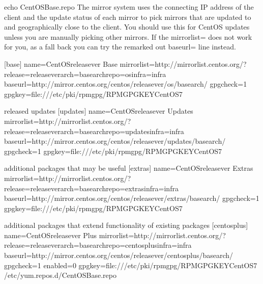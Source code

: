 \documentclass[letterpaper,10pt,english]{sphinxmanual}
\begin{document}
%
\begin{sphinxVerbatim}[commandchars=\\\{\}]
echo\PYGZdq{}
\PYGZsh{} CentOS\PYGZhy{}Base.repo
\PYGZsh{}
\PYGZsh{} The mirror system uses the connecting IP address of the client and the
\PYGZsh{} update status of each mirror to pick mirrors that are updated to and
\PYGZsh{} geographically close to the client.  You should use this for CentOS updates
\PYGZsh{} unless you are manually picking other mirrors.
\PYGZsh{}
\PYGZsh{} If the mirrorlist= does not work for you, as a fall back you can try the
\PYGZsh{} remarked out baseurl= line instead.
\PYGZsh{}
\PYGZsh{}

[base]
name=CentOS\PYGZhy{}\PYGZdl{}releasever \PYGZhy{} Base
mirrorlist=http://mirrorlist.centos.org/?release=\PYGZdl{}releasever\PYGZam{}arch=\PYGZdl{}basearch\PYGZam{}repo=os\PYGZam{}infra=\PYGZdl{}infra
\PYGZsh{}baseurl=http://mirror.centos.org/centos/\PYGZdl{}releasever/os/\PYGZdl{}basearch/
gpgcheck=1
gpgkey=file:///etc/pki/rpm\PYGZhy{}gpg/RPM\PYGZhy{}GPG\PYGZhy{}KEY\PYGZhy{}CentOS\PYGZhy{}7

\PYGZsh{}released updates
[updates]
name=CentOS\PYGZhy{}\PYGZdl{}releasever \PYGZhy{} Updates
mirrorlist=http://mirrorlist.centos.org/?release=\PYGZdl{}releasever\PYGZam{}arch=\PYGZdl{}basearch\PYGZam{}repo=updates\PYGZam{}infra=\PYGZdl{}infra
\PYGZsh{}baseurl=http://mirror.centos.org/centos/\PYGZdl{}releasever/updates/\PYGZdl{}basearch/
gpgcheck=1
gpgkey=file:///etc/pki/rpm\PYGZhy{}gpg/RPM\PYGZhy{}GPG\PYGZhy{}KEY\PYGZhy{}CentOS\PYGZhy{}7

\PYGZsh{}additional packages that may be useful
[extras]
name=CentOS\PYGZhy{}\PYGZdl{}releasever \PYGZhy{} Extras
mirrorlist=http://mirrorlist.centos.org/?release=\PYGZdl{}releasever\PYGZam{}arch=\PYGZdl{}basearch\PYGZam{}repo=extras\PYGZam{}infra=\PYGZdl{}infra
\PYGZsh{}baseurl=http://mirror.centos.org/centos/\PYGZdl{}releasever/extras/\PYGZdl{}basearch/
gpgcheck=1
gpgkey=file:///etc/pki/rpm\PYGZhy{}gpg/RPM\PYGZhy{}GPG\PYGZhy{}KEY\PYGZhy{}CentOS\PYGZhy{}7

\PYGZsh{}additional packages that extend functionality of existing packages
[centosplus]
name=CentOS\PYGZhy{}\PYGZdl{}releasever \PYGZhy{} Plus
mirrorlist=http://mirrorlist.centos.org/?release=\PYGZdl{}releasever\PYGZam{}arch=\PYGZdl{}basearch\PYGZam{}repo=centosplus\PYGZam{}infra=\PYGZdl{}infra
\PYGZsh{}baseurl=http://mirror.centos.org/centos/\PYGZdl{}releasever/centosplus/\PYGZdl{}basearch/
gpgcheck=1
enabled=0
gpgkey=file:///etc/pki/rpm\PYGZhy{}gpg/RPM\PYGZhy{}GPG\PYGZhy{}KEY\PYGZhy{}CentOS\PYGZhy{}7
\PYGZdq{} \PYGZgt{} /etc/yum.repos.d/CentOS\PYGZhy{}Base.repo
\end{sphinxVerbatim}
\end{document}
